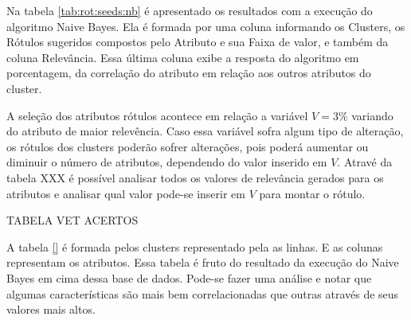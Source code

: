 Na tabela \ref{tab:rot:seeds:nb} é apresentado os resultados com a execução do algoritmo Naive Bayes. Ela é formada por uma coluna informando os Clusters, os Rótulos sugeridos compostos pelo Atributo e sua Faixa de valor, e também da coluna Relevância. Essa última coluna exibe a resposta do algoritmo em porcentagem, da correlação do atributo em relação aos outros atributos do cluster.

A seleção dos atributos rótulos acontece em relação a variável ${V=3\%}$ variando do atributo de maior relevência. Caso essa variável sofra algum tipo de alteração, os rótulos dos clusters poderão sofrer alterações, pois poderá aumentar  ou diminuir o número de atributos, dependendo do valor inserido em ${V}$. Atravé da tabela XXX é possível analisar todos os valores de relevância gerados para os atributos e analisar qual valor pode-se inserir em ${V}$ para montar o rótulo.

TABELA VET ACERTOS

A tabela \ref{} é formada pelos clusters representado pela as linhas. E as colunas representam os atributos. Essa tabela é fruto do resultado da execução do Naive Bayes em cima dessa base de dados. Pode-se fazer uma análise e notar que algumas características são mais bem correlacionadas que  outras através de seus valores mais altos. 


